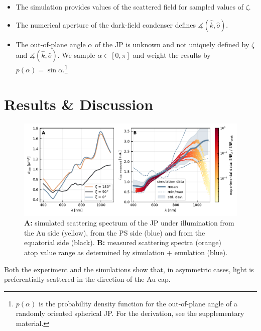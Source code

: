 \documentclass[10pt]{article}
\begin{document}
\begin{multicols}{2}
\begin{itemize}
    \item The simulation provides values of the scattered field for sampled values of $\zeta$.
    \item The numerical aperture of the dark-field condenser defines $\measuredangle(\hat{k},\hat{o})$.
    \item The out-of-plane angle $\alpha$ of the JP is unknown and not uniquely defined by $\zeta$ and $\measuredangle(\hat{k},\hat{o})$. We sample $\alpha\in\left[0,\pi\right]$ and weight the results by $p(\alpha) = \sin\alpha$.\footnote{$p(\alpha)$ is the probability density function for the out-of-plane angle of a randomly oriented spherical JP. For the derivation, see the supplementary material.}
\end{itemize}









\section*{Results \& Discussion}


\begin{figure}[t]
    \centering
    \includegraphics{[fig] spectra.PDF}
    \caption{{\sffamily\bfseries A:} simulated scattering spectrum of the JP under illumination from the Au side (yellow), from the PS side (blue) and from the equatorial side (black). {\sffamily\bfseries B:} measured scattering spectra (orange) atop value range as determined by simulation + emulation (blue).}
    \label{fig:spectra}
\end{figure}


Both the experiment and the simulations show that, in asymmetric cases, light is preferentially scattered in the direction of the Au cap. 




\end{multicols}
\end{document}
